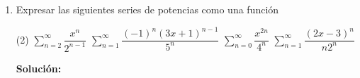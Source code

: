 \documentclass[12pt]{article}
\newenvironment{solucion}
{\begin{mdframed}[backgroundcolor=black!10]
		{\bf Solución:}\\
	}
	{
	\end{mdframed}
}
\newenvironment{preguntas}
{\begin{enumerate}\itemsep12pt
	}
	{
	\end{enumerate}
}
\begin{document}
\begin{preguntas}
\begin{solucion}
\begin{enumerate}[a)]
$$$$
Aplicando la formula,
$$ f(x)
= \dfrac{1}{16} \cdot\dfrac{1}{1 + \left(-\left(\frac{x-2}{4}\right)^2\right)}
= \sum\limits_{n=0}^{\infty} \left(-\left(\frac{x-2}{4}\right)^2\right)^n
= \sum\limits_{n=0}^{\infty} (-1)^n \dfrac{(x-2)^{2n}}{16^n}
$$
\item $f(x) = ln(1+x)$\\
\\
Es evidente que no podemos convertir la función directamente a una serie, por lo que probaremos derivandola antes.
		$$f'(x) = \dfrac{1}{1+x}$$
		Esta función si podemos convertirla en una serie usando $\dfrac{1}{1-x} = \sum\limits_{n=0}^{\infty} x^n$. Entonces,
		$$f'(x) = \dfrac{1}{1-(-x)} 
		= \sum\limits_{n=0}^{\infty} (-x)^n
		= \sum\limits_{n=0}^{\infty} (-1)^n x^n$$
		Lo único que nos queda por hacer es integrar esto. Recordemos que para integrar una serie de potencias, basta con integrar su termino general.
		
		Finalmente, 
		$$f(x) 
		= \int f'(x) dx
		= \int \sum\limits_{n=0}^{\infty} (-1)^n x^n dx
		= \sum\limits_{n=0}^{\infty} \int (-1)^n x^n dx
		= \sum\limits_{n=0}^{\infty} (-1)^n \dfrac{x^{n+1}}{n+1}$$
\end{enumerate}
\end{solucion}
\item Expresar las siguientes series de potencias como una función
\begin{tasks}(2)
\task $\sum\limits_{n=2}^\infty \dfrac{x^n}{2^{n-1}}$
\task $\sum\limits_{n=1}^\infty \dfrac{(-1)^n (3x+1)^{n-1}}{5^n}$
\task $\sum\limits_{n=0}^\infty \dfrac{x^{2n}}{4^n}$
\task $\sum\limits_{n=1}^\infty \dfrac{(2x-3)^n}{n2^n}$
\end{tasks}
\begin{solucion}


\end{solucion}
\end{preguntas}
\end{document}
